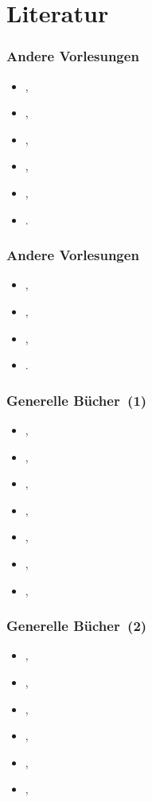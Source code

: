 \documentclass[aspectratio=169,mathserif,notheorems]{beamer}%
\begin{document}
\section{Literatur}%
%
\begin{frame}%
\frametitle{Andere Vorlesungen}%
\begin{itemize}%
\item {},%
\item {},%
\item {},%
\item {},%
\item {},%
\item {}.%
\end{itemize}%
\end{frame}%
%
\begin{frame}%
\frametitle{Andere Vorlesungen}%
\begin{itemize}%
\item {},%
\item {},%
\item {},%
\item {}.%
\end{itemize}%
\end{frame}%
%
\begin{frame}%
\frametitle{Generelle Bücher~(1)}%
\begin{itemize}%
\item {},%
\item {},%
\item {},%
\item {},%
\item {},%
\item {},%
\item {},%
\end{itemize}%
\end{frame}%
%
\begin{frame}%
\frametitle{Generelle Bücher~(2)}%
\begin{itemize}%
\item {},%
\item {},%
\item {},%
\item {},%
\item {},%
\item {},%
\end{itemize}%
\end{frame}%
\end{document}
